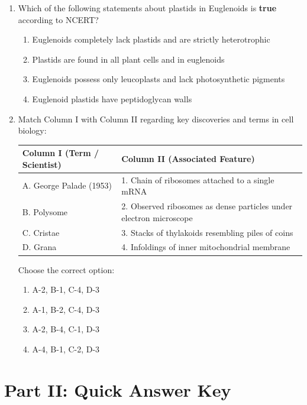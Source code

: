 \documentclass[11pt, a4paper]{article}
\begin{document}
\begin{enumerate}[label=\textbf{\arabic*.}, leftmargin=*, itemsep=8pt]
    \item Which of the following statements about plastids in Euglenoids is \textbf{true} according to NCERT?
    \begin{enumerate}[label=(\alph*)]
        \item Euglenoids completely lack plastids and are strictly heterotrophic
        \item Plastids are found in all plant cells and in euglenoids
        \item Euglenoids possess only leucoplasts and lack photosynthetic pigments
        \item Euglenoid plastids have peptidoglycan walls
    \end{enumerate}

    \item Match Column I with Column II regarding key discoveries and terms in cell biology:
    \begin{center}
    \begin{tabular}{@{}ll@{}}
        \toprule
        \textbf{Column I (Term / Scientist)} & \textbf{Column II (Associated Feature)} \\
        \midrule
        A. George Palade (1953) & 1. Chain of ribosomes attached to a single mRNA \\
        B. Polysome & 2. Observed ribosomes as dense particles under electron microscope \\
        C. Cristae & 3. Stacks of thylakoids resembling piles of coins \\
        D. Grana & 4. Infoldings of inner mitochondrial membrane \\
        \bottomrule
    \end{tabular}
    \end{center}
    Choose the correct option:
    \begin{enumerate}[label=(\alph*)]
        \item A-2, B-1, C-4, D-3
        \item A-1, B-2, C-4, D-3
        \item A-2, B-4, C-1, D-3
        \item A-4, B-1, C-2, D-3
    \end{enumerate}

\end{enumerate}

\newpage

\section*{\color{primary} Part II: Quick Answer Key}
\end{document}
